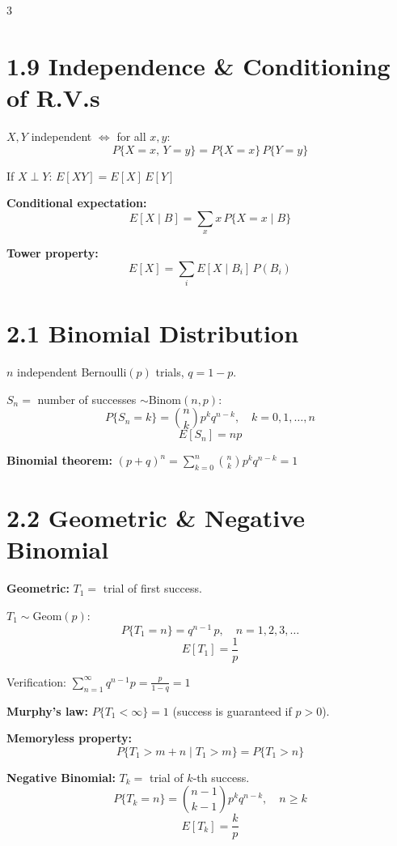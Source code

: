 \documentclass[10pt,landscape]{article}
\begin{document}
\begin{multicols}{3}
\section*{1.9 Independence \& Conditioning of R.V.s}

$X, Y$ independent $\iff$ for all $x, y$:
\[
  P\{X = x,\, Y = y\} = P\{X = x\}\,P\{Y = y\}
\]

If $X \perp Y$: $E[XY] = E[X]\,E[Y]$

\textbf{Conditional expectation:}
\[
  E[X \mid B] = \sum_{x} x\,P\{X = x \mid B\}
\]

\textbf{Tower property:}
\[
  E[X] = \sum_{i} E[X \mid B_i]\,P(B_i)
\]

\section*{2.1 Binomial Distribution}

$n$ independent Bernoulli$(p)$ trials, $q = 1 - p$.

$S_n = $ number of successes $\sim \text{Binom}(n, p)$:
\[
  P\{S_n = k\} = \binom{n}{k} p^k q^{n-k}, \quad k = 0, 1, \ldots, n
\]
\[
  E[S_n] = np
\]

\textbf{Binomial theorem:}
$\displaystyle (p + q)^n = \sum_{k=0}^{n} \binom{n}{k} p^k q^{n-k} = 1$

\section*{2.2 Geometric \& Negative Binomial}

\textbf{Geometric:} $T_1 = $ trial of first success.

$T_1 \sim \text{Geom}(p)$:
\[
  P\{T_1 = n\} = q^{n-1}\,p, \quad n = 1, 2, 3, \ldots
\]
\[
  E[T_1] = \frac{1}{p}
\]

Verification: $\displaystyle\sum_{n=1}^{\infty} q^{n-1} p = \frac{p}{1-q} = 1$

\textbf{Murphy's law:} $P\{T_1 < \infty\} = 1$ (success is guaranteed if $p > 0$).

\textbf{Memoryless property:}
\[
  P\{T_1 > m + n \mid T_1 > m\} = P\{T_1 > n\}
\]

\textbf{Negative Binomial:} $T_k = $ trial of $k$-th success.
\[
  P\{T_k = n\} = \binom{n-1}{k-1} p^k q^{n-k}, \quad n \geq k
\]
\[
  E[T_k] = \frac{k}{p}
\]


\end{multicols}
\end{document}
